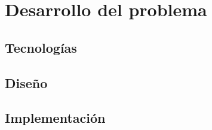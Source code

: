 \chapter{Desarrollo del problema}

\section{Tecnologías}

\section{Diseño}

\section{Implementación}
\cleardoublepage